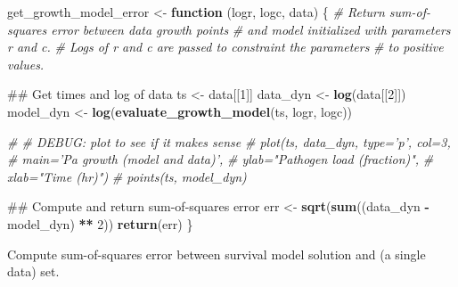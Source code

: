 \documentclass[]{article}
\newenvironment{Shaded}{\begin{snugshade}}{\end{snugshade}}
\newcommand{\KeywordTok}[1]{\textcolor[rgb]{0.13,0.29,0.53}{\textbf{#1}}}
\newcommand{\DecValTok}[1]{\textcolor[rgb]{0.00,0.00,0.81}{#1}}
\newcommand{\StringTok}[1]{\textcolor[rgb]{0.31,0.60,0.02}{#1}}
\newcommand{\CommentTok}[1]{\textcolor[rgb]{0.56,0.35,0.01}{\textit{#1}}}
\newcommand{\ControlFlowTok}[1]{\textcolor[rgb]{0.13,0.29,0.53}{\textbf{#1}}}
\newcommand{\OperatorTok}[1]{\textcolor[rgb]{0.81,0.36,0.00}{\textbf{#1}}}
\newcommand{\NormalTok}[1]{#1}
\begin{document}
\begin{Shaded}
\begin{Highlighting}[]
\NormalTok{get_growth_model_error <-}\StringTok{ }\ControlFlowTok{function}\NormalTok{ (logr, logc, data) \{}
  \CommentTok{# Return sum-of-squares error between data growth points }
  \CommentTok{# and model initialized with parameters r and c.}
  \CommentTok{# Logs of r and c are passed to constraint the parameters}
  \CommentTok{# to positive values.}
  
\NormalTok{  ## Get times and log of data}
\NormalTok{  ts <-}\StringTok{ }\NormalTok{data[[}\DecValTok{1}\NormalTok{]]}
\NormalTok{  data_dyn <-}\StringTok{ }\KeywordTok{log}\NormalTok{(data[[}\DecValTok{2}\NormalTok{]])}
\NormalTok{  model_dyn <-}\StringTok{ }\KeywordTok{log}\NormalTok{(}\KeywordTok{evaluate_growth_model}\NormalTok{(ts, logr, logc))}
  
  \CommentTok{# # DEBUG: plot to see if it makes sense}
  \CommentTok{# plot(ts, data_dyn, type='p', col=3,}
  \CommentTok{#    main='Pa growth (model and data)',}
  \CommentTok{#    ylab="Pathogen load (fraction)",}
  \CommentTok{#    xlab="Time (hr)")}
  \CommentTok{# points(ts, model_dyn)}
  
\NormalTok{  ## Compute and return sum-of-squares error}
\NormalTok{  err <-}\StringTok{ }\KeywordTok{sqrt}\NormalTok{(}\KeywordTok{sum}\NormalTok{((data_dyn }\OperatorTok{-}\StringTok{ }\NormalTok{model_dyn) }\OperatorTok{**}\StringTok{ }\DecValTok{2}\NormalTok{))}
  \KeywordTok{return}\NormalTok{(err)}
\NormalTok{\}}
\end{Highlighting}
\end{Shaded}

Compute sum-of-squares error between survival model solution and (a
single data) set.
\end{document}
